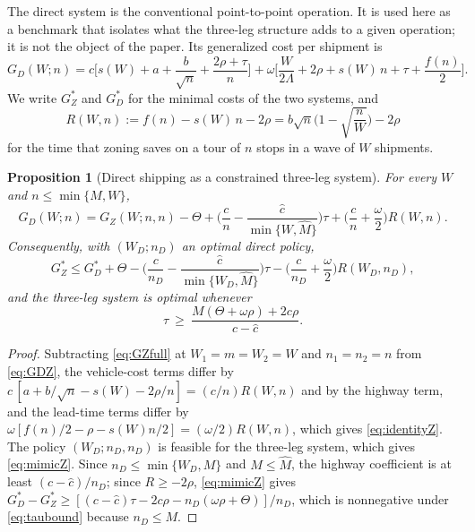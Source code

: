 \documentclass[10pt, reqno]{amsart}
\newtheorem{proposition}{Proposition}
\theoremstyle{definition}
\begin{document}
The direct system is the conventional point-to-point operation. It is used here as a benchmark that isolates what the three-leg structure adds to a given operation; it is not the object of the paper. Its generalized cost per shipment is
\begin{equation}\label{eq:GDZ}
G_D(W;n)=c\Big[s(W)+a+\frac{b}{\sqrt n}+\frac{2\rho+\tau}{n}\Big]+\omega\Big[\frac{W}{2\Lambda}+2\rho+s(W)\,n+\tau+\frac{f(n)}{2}\Big].
\end{equation}
We write $G_Z^*$ and $G_D^*$ for the minimal costs of the two systems, and
\begin{equation}\label{eq:R}
R(W,n):=f(n)-s(W)\,n-2\rho=b\sqrt n\Big(1-\sqrt{\frac nW}\Big)-2\rho
\end{equation}
for the time that zoning saves on a tour of $n$ stops in a wave of $W$ shipments.

\begin{proposition}[Direct shipping as a constrained three-leg system]\label{prop:bench}
For every $W$ and $n\le\min\{M,W\}$,
\begin{equation}\label{eq:identityZ}
G_D(W;n)=G_Z(W;n,n)-\Theta+\Big(\frac cn-\frac{\hat c}{\min\{W,\hat M\}}\Big)\tau+\Big(\frac cn+\frac\omega2\Big)R(W,n).
\end{equation}
Consequently, with $(W_D;n_D)$ an optimal direct policy,
\begin{equation}\label{eq:mimicZ}
G_Z^*\le G_D^*+\Theta-\Big(\frac c{n_D}-\frac{\hat c}{\min\{W_D,\hat M\}}\Big)\tau-\Big(\frac c{n_D}+\frac\omega2\Big)R(W_D,n_D),
\end{equation}
and the three-leg system is optimal whenever
\begin{equation}\label{eq:taubound}
\tau\ \ge\ \frac{M(\Theta+\omega\rho)+2c\rho}{c-\hat c}.
\end{equation}
\end{proposition}

\begin{proof}
Subtracting \eqref{eq:GZfull} at $W_1=m=W_2=W$ and $n_1=n_2=n$ from \eqref{eq:GDZ}, the vehicle-cost terms differ by $c\,[a+b/\sqrt n-s(W)-2\rho/n]=(c/n)R(W,n)$ and by the highway term, and the lead-time terms differ by $\omega[f(n)/2-\rho-s(W)n/2]=(\omega/2)R(W,n)$, which gives \eqref{eq:identityZ}. The policy $(W_D;n_D,n_D)$ is feasible for the three-leg system, which gives \eqref{eq:mimicZ}. Since $n_D\le\min\{W_D,M\}$ and $M\le\hat M$, the highway coefficient is at least $(c-\hat c)/n_D$; since $R\ge-2\rho$, \eqref{eq:mimicZ} gives $G_D^*-G_Z^*\ge[(c-\hat c)\tau-2c\rho-n_D(\omega\rho+\Theta)]/n_D$, which is nonnegative under \eqref{eq:taubound} because $n_D\le M$.
\end{proof}
\end{document}
